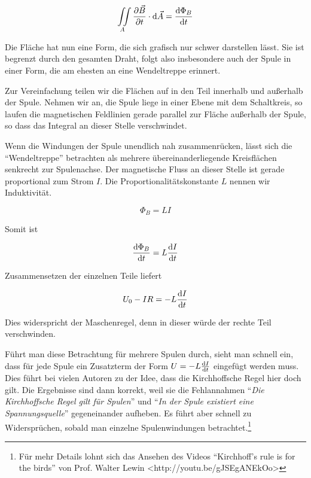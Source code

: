 \documentclass[a4paper,german,12pt,smallheadings]{scrartcl}
\begin{document}
\begin{equation}
  \iint\limits_{A} \frac{\partial \vec{B}}{\partial t} \cdot \dif \vec{A} = \frac{\dif \Phi_B}{\dif t}
\end{equation}

Die Fläche hat nun eine Form, die sich grafisch nur schwer darstellen lässt.
Sie ist begrenzt durch den gesamten Draht, folgt also insbesondere auch der
Spule in einer Form, die am ehesten an eine Wendeltreppe erinnert.

Zur Vereinfachung teilen wir die Flächen auf in den Teil innerhalb und
außerhalb der Spule. Nehmen wir an, die Spule liege in einer Ebene mit dem
Schaltkreis, so laufen die magnetischen Feldlinien gerade parallel zur Fläche
außerhalb der Spule, so dass das Integral an dieser Stelle verschwindet.

Wenn die Windungen der Spule unendlich nah zusammenrücken, lässt sich die
``Wendeltreppe'' betrachten als mehrere übereinanderliegende Kreisflächen
senkrecht zur Spulenachse. Der magnetische Fluss an dieser Stelle ist gerade
proportional zum Strom $I$. Die Proportionalitätskonstante $L$ nennen wir
Induktivität.

\begin{equation}
  \Phi_B = L I
\end{equation}

Somit ist

\begin{equation}
  \frac{\dif \Phi_B}{\dif t} = L \frac{\dif I}{\dif t}
\end{equation}

Zusammensetzen der einzelnen Teile liefert

\begin{equation}
  U_0 - IR = -L \frac{\dif I}{\dif t}
  \label{eq:ind}
\end{equation}

Dies widerspricht der Maschenregel, denn in dieser würde der rechte Teil
verschwinden.

Führt man diese Betrachtung für mehrere Spulen durch, sieht man schnell ein,
dass für jede Spule ein Zusatzterm der Form $U = -L \frac{\dif I}{\dif t}$
eingefügt werden muss. Dies führt bei vielen Autoren zu der Idee, dass die
Kirchhoffsche Regel hier doch gilt. Die Ergebnisse sind dann korrekt, weil sie
die Fehlannahmen ``\textit{Die Kirchhoffsche Regel gilt für Spulen}'' und
``\textit{In der Spule existiert eine Spannungsquelle}'' gegeneinander
aufheben. Es führt aber schnell zu Widersprüchen, sobald man einzelne
Spulenwindungen betrachtet.\footnote{Für mehr Details lohnt sich das Ansehen
des Videos ``Kirchhoff's rule is for the birds'' von Prof. Walter Lewin
<http://youtu.be/gJSEgANEkOo>}
\end{document}

